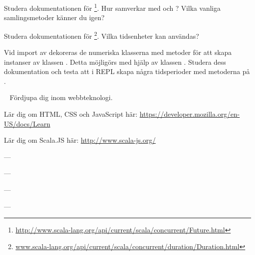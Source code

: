 \Subtask Studera dokumentationen för \footnote{\href{http://www.scala-lang.org/api/current/scala/concurrent/Future.html}{http://www.scala-lang.org/api/current/scala/concurrent/Future.html}}. Hur samverkar  med  och ? Vilka vanliga samlingsmetoder känner du igen?

\Subtask Studera dokumentationen för \footnote{\href{http://www.scala-lang.org/api/current/scala/concurrent/duration/Duration.html}{www.scala-lang.org/api/current/scala/concurrent/duration/Duration.html}}. Vilka tidsenheter kan användas?

\Subtask Vid import av  dekoreras de numeriska klasserna med metoder för att skapa instanser av klassen . Detta möjligörs med hjälp av klassen . Studera dess dokumentation och testa att i REPL skapa några tidsperioder med metoderna på .



\SOLUTION


\TaskSolved \what

\SubtaskSolved

\SubtaskSolved

\SubtaskSolved


\QUESTEND






\WHAT{}

\QUESTBEGIN

\Task  \what~ Fördjupa dig inom webbteknologi.

\Subtask Lär dig om HTML, CSS och JavaScript här: \url{https://developer.mozilla.org/en-US/docs/Learn}

\Subtask Lär dig om Scala.JS här: \url{http://www.scala-js.org/}\SOLUTION


\TaskSolved \what

\SubtaskSolved  ---

\SubtaskSolved  ---

\SubtaskSolved  ---

\SubtaskSolved  ---
\QUESTEND
